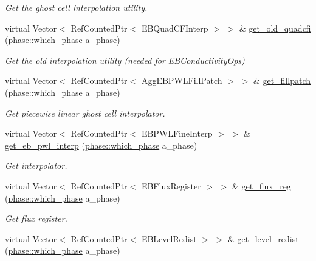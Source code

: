 \begin{DoxyCompactItemize}
\begin{DoxyCompactList}\small\item\em Get the ghost cell interpolation utility. \end{DoxyCompactList}\item 
virtual Vector$<$ Ref\+Counted\+Ptr$<$ E\+B\+Quad\+C\+F\+Interp $>$ $>$ \& \hyperlink{classamr__mesh_a4be86b6c38c09488bc8c8ebbede3a30c}{get\+\_\+old\+\_\+quadcfi} (\hyperlink{namespacephase_a23c76f548a5eb1955ed8c929c541108b}{phase\+::which\+\_\+phase} a\+\_\+phase)
\begin{DoxyCompactList}\small\item\em Get the old interpolation utility (needed for E\+B\+Conductivity\+Ops) \end{DoxyCompactList}\item 
virtual Vector$<$ Ref\+Counted\+Ptr$<$ Agg\+E\+B\+P\+W\+L\+Fill\+Patch $>$ $>$ \& \hyperlink{classamr__mesh_a19dd41f27cd0bb654f216ce727cdbd0f}{get\+\_\+fillpatch} (\hyperlink{namespacephase_a23c76f548a5eb1955ed8c929c541108b}{phase\+::which\+\_\+phase} a\+\_\+phase)
\begin{DoxyCompactList}\small\item\em Get piecewise linear ghost cell interpolator. \end{DoxyCompactList}\item 
virtual Vector$<$ Ref\+Counted\+Ptr$<$ E\+B\+P\+W\+L\+Fine\+Interp $>$ $>$ \& \hyperlink{classamr__mesh_a70623ff41a106a323ee2f85f28aa1546}{get\+\_\+eb\+\_\+pwl\+\_\+interp} (\hyperlink{namespacephase_a23c76f548a5eb1955ed8c929c541108b}{phase\+::which\+\_\+phase} a\+\_\+phase)
\begin{DoxyCompactList}\small\item\em Get interpolator. \end{DoxyCompactList}\item 
virtual Vector$<$ Ref\+Counted\+Ptr$<$ E\+B\+Flux\+Register $>$ $>$ \& \hyperlink{classamr__mesh_a5cd40531cffa27823d1ce9d3f34dc98b}{get\+\_\+flux\+\_\+reg} (\hyperlink{namespacephase_a23c76f548a5eb1955ed8c929c541108b}{phase\+::which\+\_\+phase} a\+\_\+phase)
\begin{DoxyCompactList}\small\item\em Get flux register. \end{DoxyCompactList}\item 
virtual Vector$<$ Ref\+Counted\+Ptr$<$ E\+B\+Level\+Redist $>$ $>$ \& \hyperlink{classamr__mesh_aa96148986354dba6b452cea811d0a36c}{get\+\_\+level\+\_\+redist} (\hyperlink{namespacephase_a23c76f548a5eb1955ed8c929c541108b}{phase\+::which\+\_\+phase} a\+\_\+phase)

\end{DoxyCompactItemize}

